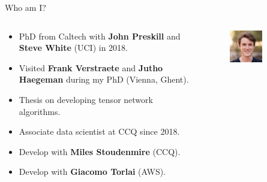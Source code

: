 \begin{frame}{Who am I?}

\begin{columns}

  \begin{column}[T, onlytextwidth]{.6\textwidth}%

    \setlength{\partopsep}{0pt}%

    \begin{itemize}[<+->]

      \item PhD from Caltech with \textbf{John Preskill} and \textbf{Steve White} (UCI) in 2018.
      \item Visited \textbf{Frank Verstraete} and \textbf{Jutho Haegeman} during my PhD (Vienna, Ghent).
      \item Thesis on developing tensor network algorithms.
      \item Associate data scientist at CCQ since 2018.
      \item Develop  with \textbf{Miles Stoudenmire} (CCQ).
      \item Develop  with \textbf{Giacomo Torlai} (AWS).

    \end{itemize}

  \end{column}

  \begin{column}[T]{0.3\textwidth}

    \begin{figure}[T]

      \includegraphics[width=0.6\textwidth]{
        slides/assets/who-am-i-fishman.jpg
      }
      \caption{}


\end{figure}
\end{column}
\end{columns}
\end{frame}

